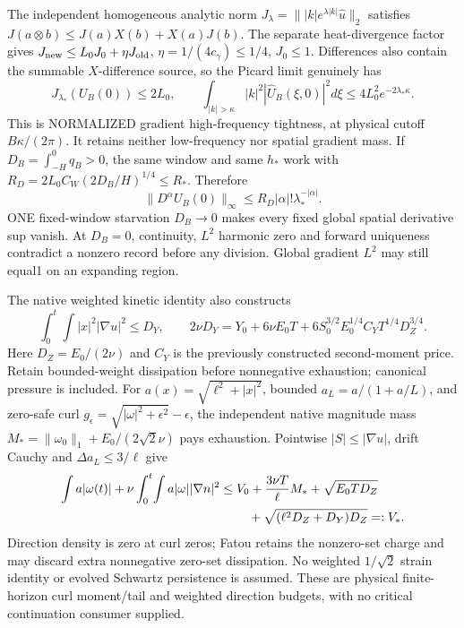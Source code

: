\documentclass[11pt]{article}
\begin{document}
The independent homogeneous analytic norm
$J_\lambda=\||k|e^{\lambda|k|}\widehat u\|_2$ satisfies
$J(a\otimes b)\le J(a)X(b)+X(a)J(b)$. The separate heat-divergence
factor gives $J_{\rm new}\le L_0J_0+\eta J_{\rm old}$,
$\eta=1/(4c_\gamma)\le1/4$, $J_0\le1$. Differences also contain the
summable $X$-difference source, so the Picard limit genuinely has
\[
 J_{\lambda_*}(U_B(0))\le2L_0,\qquad
 \int_{|k|>\kappa}|k|^2|\widehat U_B(\xi,0)|^2d\xi
       \le4L_0^2e^{-2\lambda_*\kappa}.
\]
This is NORMALIZED gradient high-frequency tightness, at physical cutoff
$B\kappa/(2\pi)$. It retains neither low-frequency nor spatial gradient mass.
If $D_B=\int_{-H}^0q_B>0$, the same window and same $h_*$ work with
$R_D=2L_0C_W(2D_B/H)^{1/4}\le R_*$. Therefore
\[
 \|D^\alpha U_B(0)\|_\infty
 \le R_D|\alpha|!\lambda_*^{-|\alpha|}.
\]
ONE fixed-window starvation $D_B\to0$ makes every fixed global spatial
derivative sup vanish. At $D_B=0$, continuity, $L^2$ harmonic zero and
forward uniqueness contradict a nonzero record before any division.
Global gradient $L^2$ may still equal1 on an expanding region.

The native weighted kinetic identity also constructs
\[
 \int_0^t\!\int |x|^2|\nabla u|^2\le D_Y,
 \qquad
 2\nu D_Y=Y_0+6\nu E_0T+
 6S_0^{3/2}E_0^{1/4}C_YT^{1/4}D_Z^{3/4}.
\]
Here $D_Z=E_0/(2\nu)$ and $C_Y$ is the previously constructed second-moment
price. Retain bounded-weight dissipation before nonnegative exhaustion;
canonical pressure is included. For $a(x)=\sqrt{\ell^2+|x|^2}$, bounded
$a_L=a/(1+a/L)$, and zero-safe curl $g_\epsilon=\sqrt{|\omega|^2+\epsilon^2}-\epsilon$,
the independent native magnitude mass
$M_*=\|\omega_0\|_1+E_0/(2\sqrt2\nu)$ pays exhaustion. Pointwise
$|S|\le|\nabla u|$, drift Cauchy and $\Delta a_L\le3/\ell$ give
\begin{align*}
 \int a|\omega(t)|+\nu\int_0^t\!\int a|\omega||\nabla n|^2
 &\le V_0+\frac{3\nu T}{\ell}M_*+\sqrt{E_0TD_Z}\\
 &\hspace{8mm}+\sqrt{(\ell^2D_Z+D_Y)D_Z}=:V_*.
\end{align*}
Direction density is zero at curl zeros; Fatou retains the nonzero-set
charge and may discard extra nonnegative zero-set dissipation. No weighted
$1/\sqrt2$ strain identity or evolved Schwartz persistence is assumed.
These are physical finite-horizon curl moment/tail and weighted direction
budgets, with no critical continuation consumer supplied.
\end{document}
